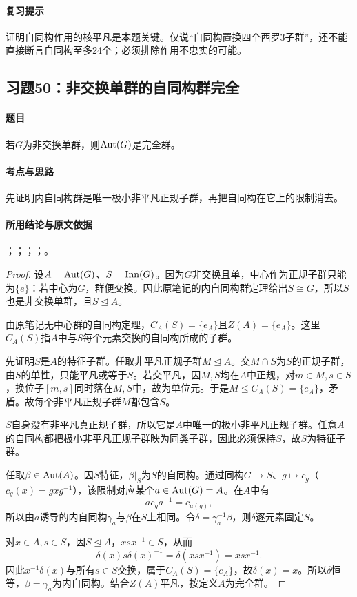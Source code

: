\paragraph{复习提示}
证明自同构作用的核平凡是本题关键。仅说“自同构置换四个西罗3子群”，还不能直接断言自同构至多24个；必须排除作用不忠实的可能。


\subsection{习题50：\texorpdfstring{非交换单群的自同构群完全}{非交换单群的自同构群完全}}
\label{ex:2:50}

\paragraph{题目}
若$G$为非交换单群，则$\operatorname{Aut}(G)$是完全群。

\paragraph{考点与思路}
先证明内自同构群是唯一极小非平凡正规子群，再把自同构在它上的限制消去。

\paragraph{所用结论与原文依据}
；；；；。


\begin{proof}
设$A=\operatorname{Aut}(G)$、$S=\operatorname{Inn}(G)$。因为$G$非交换且单，中心作为正规子群只能为$\{e\}$：若中心为$G$，群便交换。因此原笔记的内自同构群定理给出$S\cong G$，所以$S$也是非交换单群，且$S\trianglelefteq A$。

由原笔记无中心群的自同构定理，$C_A(S)=\{e_A\}$且$Z(A)=\{e_A\}$。这里$C_A(S)$指$A$中与$S$每个元素交换的自同构所成的子群。

先证明$S$是$A$的特征子群。任取非平凡正规子群$M\trianglelefteq A$。交$M\cap S$为$S$的正规子群，由$S$的单性，只能平凡或等于$S$。若交平凡，因$M,S$均在$A$中正规，对$m\in M,s\in S$，换位子$[m,s]$同时落在$M,S$中，故为单位元。于是$M\leq C_A(S)=\{e_A\}$，矛盾。故每个非平凡正规子群$M$都包含$S$。

$S$自身没有非平凡真正规子群，所以它是$A$中唯一的极小非平凡正规子群。任意$A$的自同构都把极小非平凡正规子群映为同类子群，因此必须保持$S$，故$S$为特征子群。

任取$\beta\in\operatorname{Aut}(A)$。因$S$特征，$\beta|_S$为$S$的自同构。通过同构$G\to S$、$g\mapsto c_g$（$c_g(x)=gxg^{-1}$），该限制对应某个$a\in\operatorname{Aut}(G)=A$。在$A$中有
\[
ac_ga^{-1}=c_{a(g)},
\]
所以由$a$诱导的内自同构$\gamma_a$与$\beta$在$S$上相同。令$\delta=\gamma_a^{-1}\beta$，则$\delta$逐元素固定$S$。

对$x\in A,s\in S$，因$S\trianglelefteq A$，$xsx^{-1}\in S$，从而
\[
\delta(x)s\delta(x)^{-1}=\delta(xsx^{-1})=xsx^{-1}.
\]
因此$x^{-1}\delta(x)$与所有$s\in S$交换，属于$C_A(S)=\{e_A\}$，故$\delta(x)=x$。所以$\delta$恒等，$\beta=\gamma_a$为内自同构。结合$Z(A)$平凡，按定义$A$为完全群。
\end{proof}

